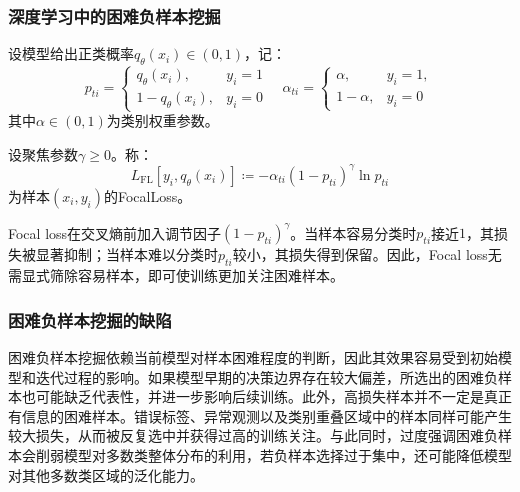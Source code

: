 \subsubsection{深度学习中的困难负样本挖掘}
设模型给出正类概率$q_{\theta}(x_i)\in(0,1)$，记：
\begin{equation*}
	p_{ti}=
	\begin{cases}
		q_{\theta}(x_i), &y_i=1 \\
		1-q_{\theta}(x_i), &y_i=0
	\end{cases}
	\quad
	\alpha_{ti}=
	\begin{cases}
		\alpha,& y_i=1, \\
		1-\alpha,& y_i=0
	\end{cases}
\end{equation*}
其中$\alpha\in(0,1)$为类别权重参数。
\begin{definition}
	设聚焦参数$\gamma\geqslant0$。称：
	\begin{equation*}
		L_{\mathrm{FL}}[y_i,q_{\theta}(x_i)]
		\coloneq-\alpha_{ti}(1-p_{ti})^{\gamma}\ln p_{ti}
	\end{equation*}
	为样本$(x_i,y_i)$的\gls{FocalLoss}。
\end{definition}
Focal loss在交叉熵前加入调节因子$(1-p_{ti})^{\gamma}$。当样本容易分类时$p_{ti}$接近$1$，其损失被显著抑制；当样本难以分类时$p_{ti}$较小，其损失得到保留。因此，Focal loss无需显式筛除容易样本，即可使训练更加关注困难样本。
\subsubsection{困难负样本挖掘的缺陷}
困难负样本挖掘依赖当前模型对样本困难程度的判断，因此其效果容易受到初始模型和迭代过程的影响。如果模型早期的决策边界存在较大偏差，所选出的困难负样本也可能缺乏代表性，并进一步影响后续训练。此外，高损失样本并不一定是真正有信息的困难样本。错误标签、异常观测以及类别重叠区域中的样本同样可能产生较大损失，从而被反复选中并获得过高的训练关注。与此同时，过度强调困难负样本会削弱模型对多数类整体分布的利用，若负样本选择过于集中，还可能降低模型对其他多数类区域的泛化能力。

